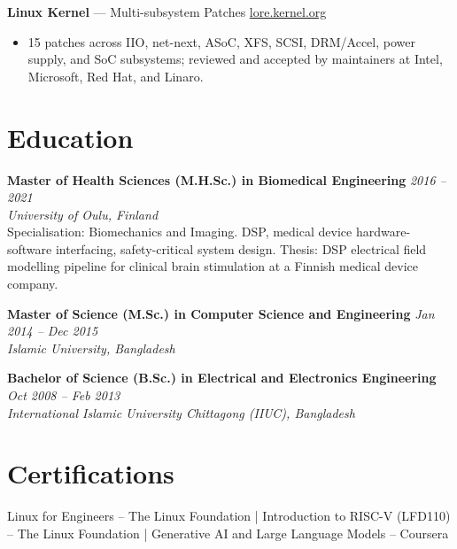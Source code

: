 \documentclass[10.5pt,a4paper]{article}
\newcommand{\job}[3]{%
  \noindent\textbf{#1} \hfill \textit{#2}\\
  \textit{\color{accent}#3}%
}
\begin{document}
\vspace{3pt}
\noindent\textbf{Linux Kernel} --- Multi-subsystem Patches \hfill
  {\small\href{https://lore.kernel.org/all/?q=Md+Shofiqul+Islam}{lore.kernel.org}}
\begin{itemize}
  \item 15 patches across IIO, net-next, ASoC, XFS, SCSI, DRM/Accel, power supply, and SoC subsystems; reviewed and accepted by maintainers at Intel, Microsoft, Red Hat, and Linaro.
\end{itemize}

\section{Education}

\job{Master of Health Sciences (M.H.Sc.) in Biomedical Engineering}{2016 -- 2021}{University of Oulu, Finland}\\
Specialisation: Biomechanics and Imaging. DSP, medical device hardware-software interfacing, safety-critical system design. Thesis: DSP electrical field modelling pipeline for clinical brain stimulation at a Finnish medical device company.

\vspace{4pt}
\job{Master of Science (M.Sc.) in Computer Science and Engineering}{Jan 2014 -- Dec 2015}{Islamic University, Bangladesh}

\vspace{4pt}
\job{Bachelor of Science (B.Sc.) in Electrical and Electronics Engineering}{Oct 2008 -- Feb 2013}{International Islamic University Chittagong (IIUC), Bangladesh}

\section{Certifications}

Linux for Engineers -- The Linux Foundation \quad|\quad
Introduction to RISC-V (LFD110) -- The Linux Foundation \quad|\quad
Generative AI and Large Language Models -- Coursera
\end{document}
